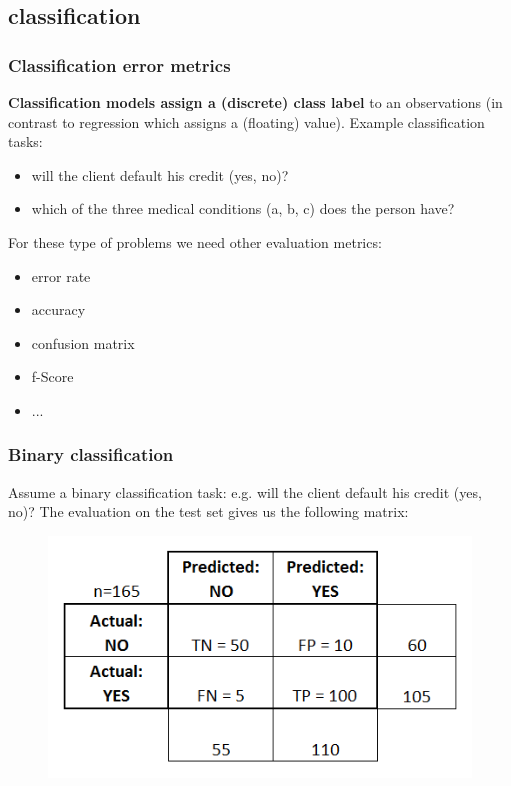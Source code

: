 \documentclass{beamer}
\begin{document}
\subsection{classification}
\begin{frame}
\frametitle{Classification error metrics}
\textbf{Classification models assign a (discrete) class label} to an observations (in contrast to regression which assigns a (floating) value). 
\newline
Example classification tasks:
\begin{itemize}
\item will the client default his credit (yes, no)?
\item which of the three medical conditions (a, b, c) does the person have?
\end{itemize}
\bigskip
For these type of problems we need other evaluation metrics:
\begin{itemize}
\item error rate
\item accuracy
\item confusion matrix
\item f-Score
\item ...
\end{itemize}
\end{frame}

\begin{frame}
\frametitle{Binary classification }
Assume a binary classification task: e.g. will the client default his credit (yes, no)?
\newline
The evaluation on the test set gives us the following matrix:
\begin{figure}
\includegraphics[width = 0.6\linewidth]{figures/03/confusion_matrix2.png}
\end{figure}
\end{frame}
\end{document}
